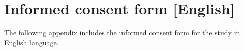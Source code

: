 \chapter{Informed consent form [English]}
\label{app:consentformEnglish}
The following appendix includes the informed consent form for the study in English language.

